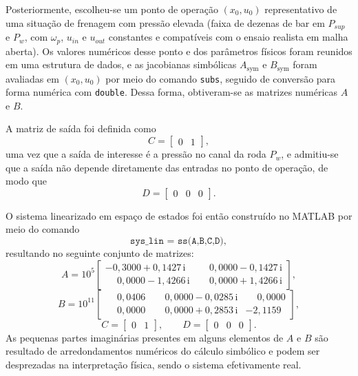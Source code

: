 Posteriormente, escolheu-se um ponto de operação $(x_0,u_0)$ representativo de uma situação de frenagem com pressão elevada (faixa de dezenas de bar em $P_{sup}$ e $P_w$, com $\omega_p$, $u_{in}$ e $u_{out}$ constantes e compatíveis com o ensaio realista em malha aberta). Os valores numéricos desse ponto e dos parâmetros físicos foram reunidos em uma estrutura de dados, e as jacobianas simbólicas $A_{\text{sym}}$ e $B_{\text{sym}}$ foram avaliadas em $(x_0,u_0)$ por meio do comando \texttt{subs}, seguido de conversão para forma numérica com \texttt{double}. Dessa forma, obtiveram-se as matrizes numéricas $A$ e $B$.

A matriz de saída foi definida como
\[
    C = \begin{bmatrix} 0 & 1 \end{bmatrix},
\]
uma vez que a saída de interesse é a pressão no canal da roda $P_w$, e admitiu-se que a saída não depende diretamente das entradas no ponto de operação, de modo que
\[
    D = \begin{bmatrix} 0 & 0 & 0 \end{bmatrix}.
\]

O sistema linearizado em espaço de estados foi então construído no MATLAB por meio do comando
\[
    \texttt{sys\_lin = ss(A,B,C,D)},
\]
resultando no seguinte conjunto de matrizes:
\[
    A =
    10^{5}
    \begin{bmatrix}
        -0{,}3000 + 0{,}1427\,\mathrm{i} & \phantom{-}0{,}0000 - 0{,}1427\,\mathrm{i} \\
        \phantom{-}0{,}0000 - 1{,}4266\,\mathrm{i} & \phantom{-}0{,}0000 + 1{,}4266\,\mathrm{i}
    \end{bmatrix},
\]
\[
    B =
    10^{11}
    \begin{bmatrix}
        \phantom{-}0{,}0406 & \phantom{-}0{,}0000 - 0{,}0285\,\mathrm{i} & \phantom{-}0{,}0000 \\
        \phantom{-}0{,}0000 & \phantom{-}0{,}0000 + 0{,}2853\,\mathrm{i} & -2{,}1159
    \end{bmatrix},
\]
\[
    C = \begin{bmatrix} 0 & 1 \end{bmatrix},
    \qquad
    D = \begin{bmatrix} 0 & 0 & 0 \end{bmatrix}.
\]
As pequenas partes imaginárias presentes em alguns elementos de $A$ e $B$ são resultado de arredondamentos numéricos do cálculo simbólico e podem ser desprezadas na interpretação física, sendo o sistema efetivamente real.

